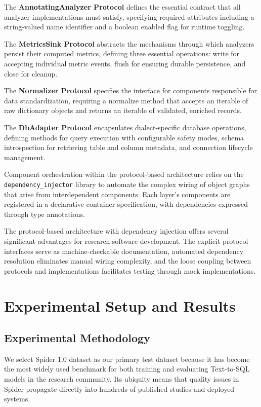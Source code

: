 \documentclass[]{einformatica}
\begin{document}
The \textbf{AnnotatingAnalyzer Protocol} defines the essential contract that all analyzer implementations must satisfy, specifying required attributes including a string-valued name identifier and a boolean enabled flag for runtime toggling.

The \textbf{MetricsSink Protocol} abstracts the mechanisms through which analyzers persist their computed metrics, defining three essential operations: write for accepting individual metric events, flush for ensuring durable persistence, and close for cleanup.

The \textbf{Normalizer Protocol} specifies the interface for components responsible for data standardization, requiring a normalize method that accepts an iterable of raw dictionary objects and returns an iterable of validated, enriched records.

The \textbf{DbAdapter Protocol} encapsulates dialect-specific database operations, defining methods for query execution with configurable safety modes, schema introspection for retrieving table and column metadata, and connection lifecycle management.

Component orchestration within the protocol-based architecture relies on the \texttt{dependency\_injector} library to automate the complex wiring of object graphs that arise from interdependent components. Each layer's components are registered in a declarative container specification, with dependencies expressed through type annotations.

The protocol-based architecture with dependency injection offers several significant advantages for research software development. The explicit protocol interfaces serve as machine-checkable documentation, automated dependency resolution eliminates manual wiring complexity, and the loose coupling between protocols and implementations facilitates testing through mock implementations.

\section{Experimental Setup and Results}\label{sec:Results}

\subsection{Experimental Methodology}

We select Spider 1.0 dataset as our primary test dataset because it has become the most widely used benchmark for both training and evaluating Text-to-SQL models in the research community. Its ubiquity means that quality issues in Spider propagate directly into hundreds of published studies and deployed systems.
\end{document}
